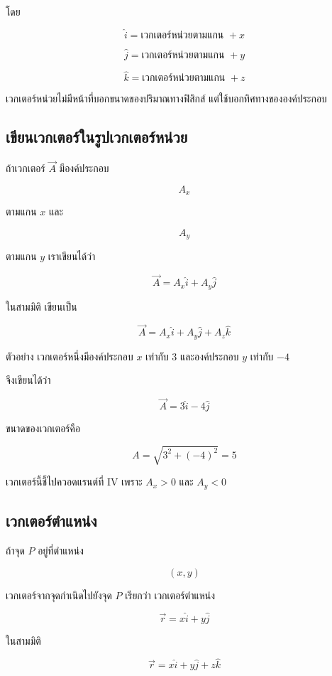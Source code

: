 \documentclass[12pt,a4paper]{report}
\begin{document}
โดย

\[
\hat{i} = \text{เวกเตอร์หน่วยตามแกน } +x
\]

\[
\hat{j} = \text{เวกเตอร์หน่วยตามแกน } +y
\]

\[
\hat{k} = \text{เวกเตอร์หน่วยตามแกน } +z
\]

\begin{tcolorbox}[title=ความหมายของเวกเตอร์หน่วย]
เวกเตอร์หน่วยไม่มีหน้าที่บอกขนาดของปริมาณทางฟิสิกส์ แต่ใช้บอกทิศทางขององค์ประกอบ
\end{tcolorbox}

\subsection{เขียนเวกเตอร์ในรูปเวกเตอร์หน่วย}

ถ้าเวกเตอร์ $\vec{A}$ มีองค์ประกอบ

\[
A_x
\]

ตามแกน $x$ และ

\[
A_y
\]

ตามแกน $y$ เราเขียนได้ว่า

\[
\vec{A}=A_x\hat{i}+A_y\hat{j}
\]

ในสามมิติ เขียนเป็น

\[
\vec{A}=A_x\hat{i}+A_y\hat{j}+A_z\hat{k}
\]

\begin{examplebox}{ตัวอย่าง}
เวกเตอร์หนึ่งมีองค์ประกอบ $x$ เท่ากับ $3$ และองค์ประกอบ $y$ เท่ากับ $-4$

จึงเขียนได้ว่า

\[
\vec{A}=3\hat{i}-4\hat{j}
\]

ขนาดของเวกเตอร์คือ

\[
A=\sqrt{3^2+(-4)^2}=5
\]

เวกเตอร์นี้ชี้ไปควอดแรนต์ที่ IV เพราะ $A_x>0$ และ $A_y<0$
\end{examplebox}

\subsection{เวกเตอร์ตำแหน่ง}

ถ้าจุด $P$ อยู่ที่ตำแหน่ง

\[
(x,y)
\]

เวกเตอร์จากจุดกำเนิดไปยังจุด $P$ เรียกว่า เวกเตอร์ตำแหน่ง

\[
\vec{r}=x\hat{i}+y\hat{j}
\]

ในสามมิติ

\[
\vec{r}=x\hat{i}+y\hat{j}+z\hat{k}
\]
\end{document}
